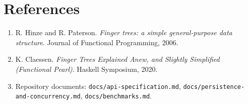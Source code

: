 \documentclass[11pt]{article}
\begin{document}
\section{References}
\label{sec:references}

\begin{enumerate}[leftmargin=1.6em, itemsep=1pt]
  \item R. Hinze and R. Paterson. \emph{Finger trees: a simple general-purpose data structure}. Journal
    of Functional Programming, 2006.
  \item K. Claessen. \emph{Finger Trees Explained Anew, and Slightly Simplified (Functional Pearl)}.
    Haskell Symposium, 2020.
  \item Repository documents: \texttt{docs/api-specification.md},
    \texttt{docs/persistence-and-concurrency.md}, \texttt{docs/benchmarks.md}.
\end{enumerate}
\end{document}
